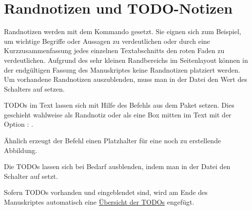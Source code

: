 \section{Randnotizen und TODO-Notizen}%
%
%
\label{sec:Randnotizen}
%
Randnotizen 
%
werden mit dem Kommando  gesetzt.
Sie eignen sich zum Beispiel, um wichtige Begriffe oder Aussagen zu verdeutlichen
oder durch eine Kurzzusammenfassung jedes einzelnen Textabschnitts
den roten Faden zu verdeutlichen.
Aufgrund des sehr kleinen Randbereichs im Seitenlayout
können in der endgültigen Fassung des Manuskriptes keine Randnotizen platziert werden.
Um \ggf vorhandene Randnotizen auszublenden,
muss man in der Datei  den Wert des Schalters
 auf  setzen.

TODOs im Text lassen sich mit Hilfe des Befehls
 aus dem Paket  setzen.
Dies geschieht wahlweise als Randnotiz
oder als eine Box mitten im Text mit der Option :
.

Ähnlich erzeugt der Befehl 
einen Platzhalter für eine noch zu erstellende Abbildung.

Die TODOs lassen sich bei Bedarf ausblenden, indem man in der Datei
 den Schalter
 auf  setzt.

Sofern TODOs vorhanden und eingeblendet sind, wird am Ende des Manuskriptes automatisch eine \hyperlink{TODO-List}{Übersicht der TODOs} engefügt.